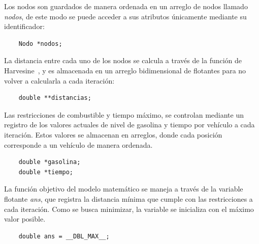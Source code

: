 \documentclass[letter, 10pt]{article}
\begin{document}
Los nodos son guardados de manera ordenada en un arreglo de nodos llamado \textit{nodos}, de este modo se puede acceder a sus atributos únicamente mediante su identificador:
\begin{lstlisting}
    Nodo *nodos;
\end{lstlisting}
La distancia entre cada uno de los nodos se calcula a través de la función de Harvesine~\cite{erdogan_green_2012}, y es almacenada en un arreglo bidimensional de flotantes para no volver a calcularla a cada iteración:
\begin{lstlisting}
    double **distancias;
\end{lstlisting}
Las restricciones de combustible y tiempo máximo, se controlan mediante un registro de los valores actuales de nivel de gasolina y tiempo por vehículo a cada iteración. Estos valores se almacenan en arreglos, donde cada posición corresponde a un vehículo de manera ordenada.
\begin{lstlisting}
    double *gasolina;
    double *tiempo;
\end{lstlisting}
La función objetivo del modelo matemático se maneja a través de la variable flotante \textit{ans}, que registra la distancia mínima que cumple con las restricciones a cada iteración. Como se busca minimizar, la variable se inicializa con el máximo valor posible.
\begin{lstlisting}
    double ans = __DBL_MAX__;
\end{lstlisting}
\end{document}
